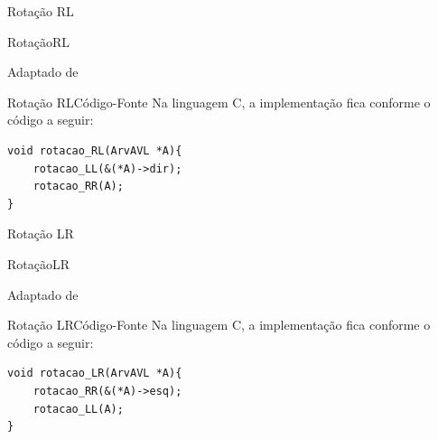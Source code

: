 \documentclass[aspectratio=169]{beamer}
\begin{document}

\begin{frame}{Rotação RL}
\begin{algorithm}[H]
\caption{RotaçãoRL} 
\label{RotacaoRL}
\end{algorithm}
\tiny{Adaptado de \cite{Backes2016}}  
\end{frame}



\begin{frame}[fragile]{Rotação RL}{Código-Fonte}
Na linguagem C, a implementação fica conforme o código a seguir:
\begin{lstlisting}[style=CStyle]
void rotacao_RL(ArvAVL *A){
    rotacao_LL(&(*A)->dir);
    rotacao_RR(A);
}
\end{lstlisting}  
\end{frame}


\begin{frame}{Rotação LR}
\begin{algorithm}[H]
\caption{RotaçãoLR} 
\label{RotacaoLR}
\end{algorithm}
\tiny{Adaptado de \cite{Backes2016}}  
\end{frame}


\begin{frame}[fragile]{Rotação LR}{Código-Fonte}
Na linguagem C, a implementação fica conforme o código a seguir:
\begin{lstlisting}[style=CStyle]
void rotacao_LR(ArvAVL *A){
    rotacao_RR(&(*A)->esq);
    rotacao_LL(A);
}
\end{lstlisting}  
\end{frame}


\end{document}
